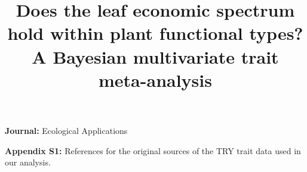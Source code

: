 \documentclass[11pt]{article}
\date{}
\title{Does the leaf economic spectrum hold within plant functional types? A Bayesian multivariate trait meta-analysis}
\begin{document}
\maketitle
\noindent \textbf{Journal:} Ecological Applications

\clearpage

\noindent
\textbf{Appendix S1:} References for the original sources of the TRY trait data used in our analysis.

\vspace{\baselineskip}

\nocite{kleyer_2008_leda_traitbase}

\nocite{wirth_2009_imprint}

\nocite{baraloto_2010_decoupled}

\nocite{craine_2009_global}

\nocite{veihmeyer_1956_soil_moisture}

\nocite{cerabolini_2010_can}

\nocite{wright_2010_functional}

\nocite{wright_2004_worldwide}

\nocite{ogaya_2003_comparative}

\nocite{akhmetzhanova_2012_rediscovered_treasure}

\nocite{frenette-dussault_2011_functional}

\nocite{medlyn_1999_effects}

\nocite{kattge_2009_quantifying}

\nocite{laughlin_2011_climatic}

\nocite{campetella_2011_patterns}

\nocite{auger_2012_inter}

\nocite{fyllas_2009_basin}

\nocite{blonder_2012_leaf}

\nocite{cornelissen_2003_functional}

\nocite{cavender-bares_2006_phylogenetic}

\nocite{garnier_2007_assessing}

\nocite{prentice_2010_evidence}

\nocite{brown_2011_assessing}

\nocite{schweingruber_2005}

\nocite{onoda_2011_global}

\nocite{han_2005_leaf}

\nocite{domingues_2010_co}

\nocite{han_2005_leaf}
\end{document}
